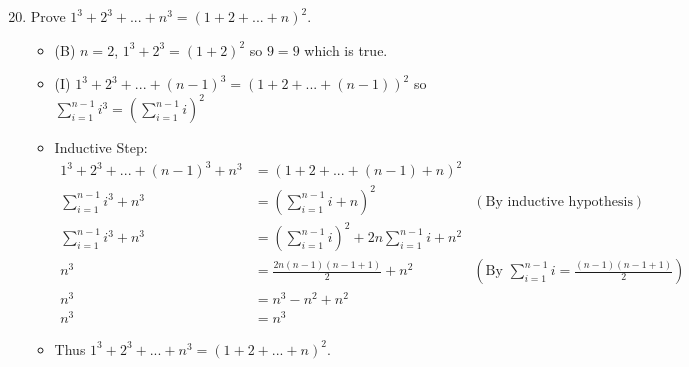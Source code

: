\documentclass[12pt]{article}
\newcommand{\paren}[1]{\left(#1\right)}
\begin{document}
\begin{enumerate}
\setcounter{enumi}{19}
\item Prove $1^3 + 2^3 + ... + n^3 = (1+2+...+n)^2$.\\
	\begin{itemize}
	\item (B) $n=2$, $1^3+2^3 = (1+2)^2$ so $9=9$ which is true.
	\item (I) $1^3 + 2^3 + ... + (n-1)^3 = (1+2+...+(n-1))^2$ so 
	$\sum_{i=1}^{n-1} i^3 = (\sum_{i=1}^{n-1}i)^2$
	\item Inductive Step:
		\begin{align*}
		1^3 + 2^3 + ... + (n-1)^3 + n^3 &= (1+2+...+(n-1)+n)^2\\
		\sum_{i=1}^{n-1} i^3 + n^3 &= (\sum_{i=1}^{n-1}i + n)^2 & (\text{By inductive hypothesis})\\
		\sum_{i=1}^{n-1} i^3 + n^3 &= (\sum_{i=1}^{n-1}i)^2 + 2n\sum_{i=1}^{n-1}i + n^2\\
		n^3 &= \frac{2n(n-1)(n-1+1)}{2}+n^2 & \paren{\text{By }\sum_{i=1}^{n-1}i = \frac{(n-1)(n-1+1)}{2}}\\
		n^3 &= n^3-n^2 + n^2\\
		n^3 &= n^3
		\end{align*}
	\item Thus $1^3 + 2^3 + ... + n^3 = (1+2+...+n)^2$.
	\end{itemize}

\end{enumerate}

\end{document}
